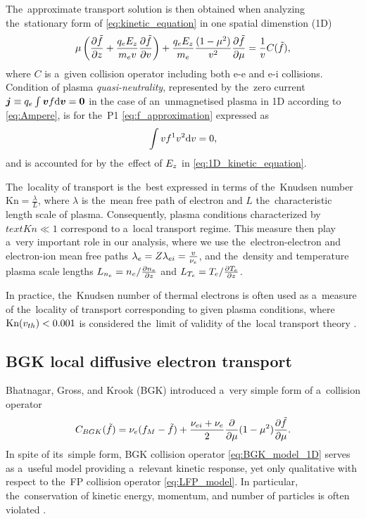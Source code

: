 The~approximate transport solution is then obtained when analyzing 
the~stationary form of \eqref{eq:kinetic_equation} in one spatial dimenstion
(1D) 
\begin{equation}
  \mu\left(\frac{\partial{\tilde{f}}}{\partial{z}} 
  + \frac{q_eE_z}{m_ev}\frac{\partial{\tilde{f}}}{\partial{v}}\right) 
  + \frac{q_eE_z}{m_e}\frac{(1-\mu^2)}{v^2}\frac{\partial{\tilde{f}}}{\partial{\mu}}
  = \frac{1}{v}C(\tilde{f}) ,
  \label{eq:1D_kinetic_equation}
\end{equation}
where $C$ is a~given collision operator including both e-e and e-i collisions.
Condition of plasma \textit{quasi-neutrality}, 
represented by the~zero current 
$\boldsymbol{j} \equiv q_e \int \boldsymbol{v} f \text{d}\boldsymbol{v} = \boldsymbol{0}$ 
in the case of an~unmagnetised plasma in 1D according to \eqref{eq:Ampere}, 
is for the~P1 \eqref{eq:f_approximation} expressed as
\begin{equation}
  \int v f^1 v^2 \text{d}v = 0 ,
  \label{eq:j0_P1}
\end{equation}
and is accounted for by the~effect of $E_z$ in \eqref{eq:1D_kinetic_equation}.

The~locality of transport is the~best expressed in terms of the~Knudsen number
$\text{Kn}=\frac{\lambda}{L}$, where $\lambda$ is the~mean free path of electron and
$L$ the~characteristic length scale of plasma. Consequently, plasma conditions
characterized by $text{Kn}\ll1$ correspond to a~local transport regime. 
This measure then
play a~very important role in our analysis, where we use the~electron-electron
and electron-ion mean free paths $\lambda_e = Z\lambda_{ei} = \frac{v}{\nu_{e}}$,
and the~density and temperature plasma scale lengths 
$L_{n_e} = n_e/\frac{\partial{n_e}}{\partial{z}}$ and $L_{T_e} = T_e/\frac{\partial{T_e}}{\partial{z}}$.

In practice, the~Knudsen number of thermal electrons is often used as 
a~measure of the~locality of transport corresponding to given plasma conditions,
where $\text{Kn}(v_{th})<0.001$ is considered the~limit of validity of 
the~local transport theory \cite{LMV_1983_7}.


\subsection{BGK local diffusive electron transport}
\label{sec:BGKDiffusiveRegime}

Bhatnagar, Gross, and Krook (BGK) introduced a~very simple form
of a~collision operator \cite{BGK_1954}
\begin{equation}
  C_{BGK}(\tilde{f})
  =
  \nu_{e}(f_M - \tilde{f})
  + \frac{\nu_{ei} + \nu_{e}}{2}
  \frac{\partial{}}{\partial{\mu}}(1 - \mu^2)\frac{\partial{\tilde{f}}}{\partial{\mu}} .
  \label{eq:BGK_model_1D}
\end{equation}
In spite of its~simple form, BGK collision operator \eqref{eq:BGK_model_1D} 
serves as a~useful model providing a~relevant kinetic response, yet only 
qualitative with respect to the~FP collision operator \eqref{eq:LFP_model}.
In particular, the~conservation of kinetic energy, momentum, 
and number of particles is often violated 
\cite{Shkarofsky_Particle_Kinetics_book_1966_24}.

